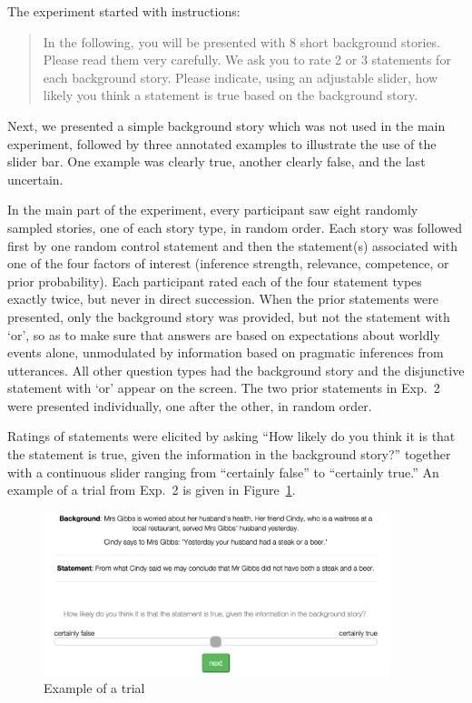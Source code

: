 \documentclass[12pt]{article}
\begin{document}
The experiment started with instructions:

\begin{quote}
  In the following, you will be presented with 8 short background stories. Please read them
  very carefully. We ask you to rate 2 or 3 statements for each background story. Please
  indicate, using an adjustable slider, how likely you think a statement is true based on the
  background story.
\end{quote}

\noindent Next, we presented a simple background story which was not used in the main
experiment, followed by three annotated examples to illustrate the use of the slider bar. One example was clearly true, another clearly false, and the last uncertain.

In the main part of the experiment, every participant saw eight randomly sampled stories, one of each story type, in random order. Each story was followed first by one random control
statement and then the statement(s) associated with one of the four factors of interest
(inference strength, relevance, competence, or prior probability). Each participant rated each of the four statement types exactly twice, but never in direct succession. When the prior statements were presented, only
the background story was provided, but not the statement with `or', so as to make sure that
answers are based on expectations about worldly events alone, unmodulated by information based
on pragmatic inferences from utterances. All other question types had the background story and
the disjunctive statement with `or' appear on the screen. The two prior statements in Exp.\ 2 were presented
individually, one after the other, in random order.

Ratings of statements were elicited by asking ``How likely do you think it is that the
statement is true, given the information in the background story?'' together with a continuous
slider ranging from ``certainly false'' to ``certainly true.'' An example of a trial from Exp.\ 2 is given
in Figure~\ref{fig:exampleShot}.

\begin{figure}
  \centering
  \includegraphics[width = 0.9\textwidth]{pics/expExampleShot.png}
  \caption{Example of a trial }
  \label{fig:exampleShot}
\end{figure}
\end{document}

